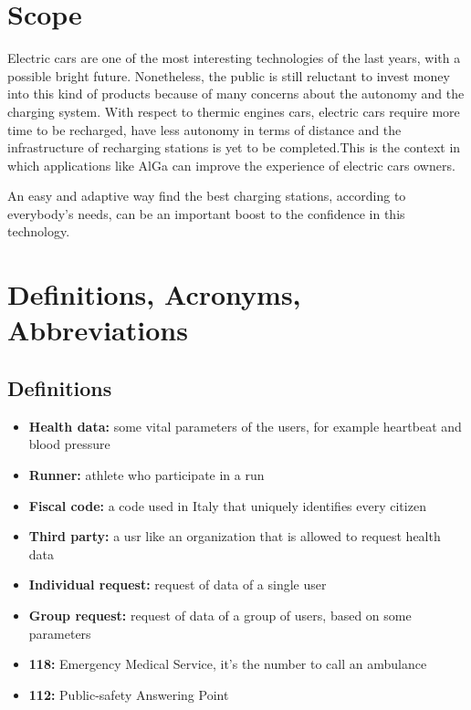 \section{Scope}
Electric cars are one of the most interesting technologies of the last years, with a possible bright future. Nonetheless, the public is still reluctant to invest money into this kind of products because of many concerns about the autonomy and the charging system.
With respect to thermic engines cars, electric cars require more time to be recharged, have less autonomy in terms of distance and the infrastructure of recharging stations is yet to be completed.This is the context in which applications like AlGa can improve the experience of electric cars owners.

An easy and adaptive way find the best charging stations, according to everybody's needs, can be an important boost to the confidence in this technology. 

        
\section{Definitions, Acronyms, Abbreviations}
\subsection*{Definitions}
\begin{itemize}
    \item \textbf{Health data:} some vital parameters of the users, for example heartbeat and blood pressure
    \item \textbf{Runner:} athlete who participate in a run
    \item \textbf{Fiscal code:} a code used in Italy that uniquely identifies every citizen
    \item \textbf{Third party:} a usr like an organization that is allowed to request health data
    \item \textbf{Individual request:} request of data of a single user 
    \item \textbf{Group request:} request of data of a group of users, based on some parameters 
    \item \textbf{118:} Emergency Medical Service, it's the number to call an ambulance
    \item \textbf{112:} Public-safety Answering Point
\end{itemize}
